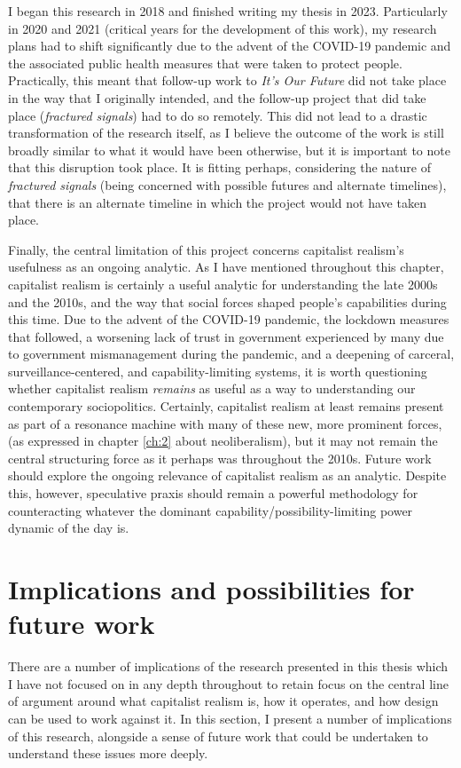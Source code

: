 I began this research in 2018 and finished writing my thesis in 2023. Particularly in 2020 and 2021 (critical years for the development of this work), my research plans had to shift significantly due to the advent of the COVID-19 pandemic and the associated public health measures that were taken to protect people. Practically, this meant that follow-up work to \textit{It's Our Future} did not take place in the way that I originally intended, and the follow-up project that did take place (\textit{fractured signals}) had to do so remotely. This did not lead to a drastic transformation of the research itself, as I believe the outcome of the work is still broadly similar to what it would have been otherwise, but it is important to note that this disruption took place. It is fitting perhaps, considering the nature of \textit{fractured signals} (being concerned with possible futures and alternate timelines), that there is an alternate timeline in which the project would not have taken place.

Finally, the central limitation of this project concerns capitalist realism's usefulness as an ongoing analytic. As I have mentioned throughout this chapter, capitalist realism is certainly a useful analytic for understanding the late 2000s and the 2010s, and the way that social forces shaped people's capabilities during this time. Due to the advent of the COVID-19 pandemic, the lockdown measures that followed, a worsening lack of trust in government experienced by many due to government mismanagement during the pandemic, and a deepening of carceral, surveillance-centered, and capability-limiting systems, it is worth questioning whether capitalist realism \textit{remains} as useful as a way to understanding our contemporary sociopolitics. Certainly, capitalist realism at least remains present as part of a resonance machine with many of these new, more prominent forces, (as expressed in chapter \ref{ch:2} about neoliberalism), but it may not remain the central structuring force as it perhaps was throughout the 2010s. Future work should explore the ongoing relevance of capitalist realism as an analytic. Despite this, however, speculative praxis should remain a powerful methodology for counteracting whatever the dominant capability/possibility-limiting power dynamic of the day is.

\section{Implications and possibilities for future work}
There are a number of implications of the research presented in this thesis which I have not focused on in any depth throughout to retain focus on the central line of argument around what capitalist realism is, how it operates, and how design can be used to work against it. In this section, I present a number of implications of this research, alongside a sense of future work that could be undertaken to understand these issues more deeply. 


